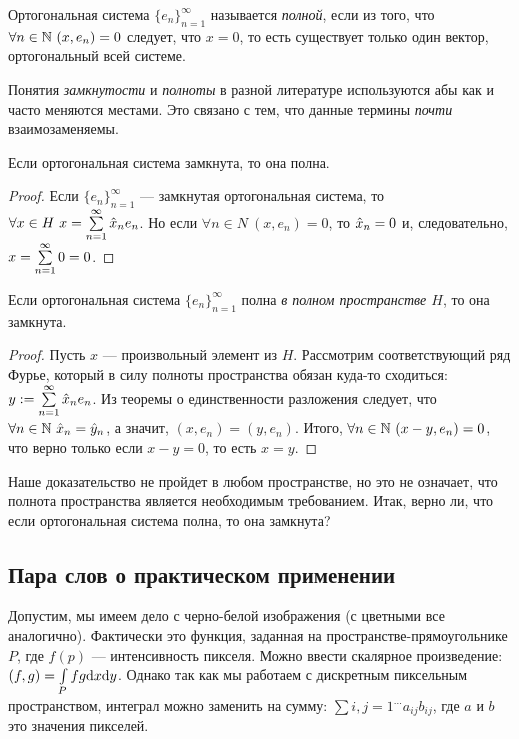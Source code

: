 \documentclass[a4paper, 12pt]{article}
\begin{document}
\begin{Def}
Ортогональная система $\{e_n\}_{n=1}^{\infty}$ называется \textit{полной}, если из того, что $\forall n \in \mathbb{N} \ (x, e_n) = 0$ следует, что $x = 0$, то есть существует только один вектор, ортогональный всей системе.
\end{Def}

Понятия \textit{замкнутости} и \textit{полноты} в разной литературе используются абы как и часто меняются местами. Это связано с тем, что данные термины \textit{почти} взаимозаменяемы.

\begin{Statement}
Если ортогональная система замкнута, то она полна.
\end{Statement}
\begin{proof}
Если $\{e_n\}_{n=1}^{\infty}$ --- замкнутая ортогональная система, то $\forall x \in H\ x = \sum\limits_{n=1}^{\infty}\hat{x}_ne_n$. Но если $\forall n \in N\ (x, e_n) = 0$, то $\hat{x}_n = 0$ и, следовательно, $x = \sum\limits_{n=1}^{\infty} 0 = 0$. 
\end{proof}

\begin{Statement}
Если ортогональная система $\{e_n\}_{n=1}^{\infty}$ полна \textit{в полном пространстве $H$}, то она замкнута.
\end{Statement}
\begin{proof}
Пусть $x$ --- произвольный элемент из $H$. Рассмотрим соответствующий ряд Фурье, который в силу полноты пространства обязан куда-то сходиться: $y := \sum\limits_{n=1}^{\infty} \hat{x}_ne_n$. Из теоремы о единственности разложения следует, что $\forall n \in \mathbb{N}\ \hat{x}_n = \hat{y}_n$, а значит, $(x, e_n) = (y, e_n)$. Итого, $\forall n \in \mathbb{N} \ (x - y, e_n) = 0$, что верно только если $x - y = 0$, то есть $x = y$.
\end{proof}
\begin{Task}
Наше доказательство не пройдет в любом пространстве, но это не означает, что полнота пространства является необходимым требованием. Итак, верно ли, что если ортогональная система полна, то она замкнута?
\end{Task}

\subsection{Пара слов о практическом применении}
Допустим, мы имеем дело с черно-белой изображения (с цветными все аналогично). Фактически это функция, заданная на пространстве-прямоугольнике $P$, где $f(p)$ --- интенсивность пикселя. Можно ввести скалярное произведение: $(f, g) = \int\limits_P fg\mathrm{d} x\mathrm{d} y$. Однако так как мы работаем с дискретным пиксельным пространством, интеграл можно заменить на сумму: $\sum\limits{i, j = 1}^{...}a_{ij}b_{ij}$, где $a$ и $b$ это значения пикселей.
\end{document}

